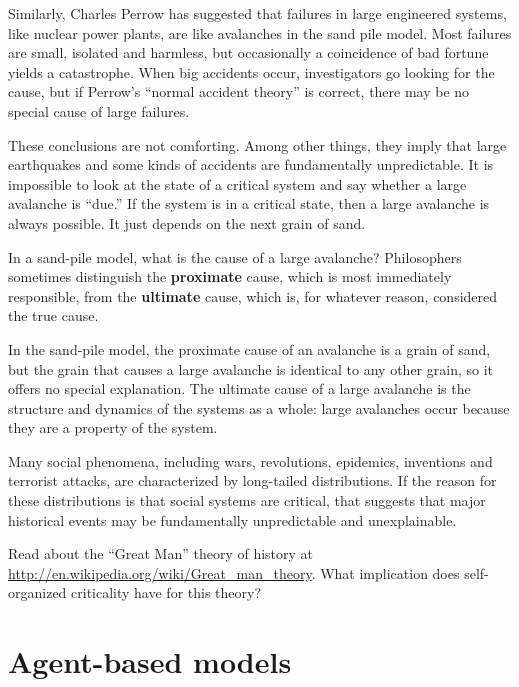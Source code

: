 \documentclass[10pt]{book}
\begin{document}
Similarly, Charles Perrow has suggested that failures in large
engineered systems, like nuclear power plants, are like avalanches
in the sand pile model.  Most failures are small, isolated and
harmless, but occasionally a coincidence of bad fortune yields a
catastrophe.  When big accidents occur, investigators go looking for
the cause, but if Perrow's ``normal accident theory'' is correct,
there may be no special cause of large failures.

These conclusions are not comforting.  Among other things, they
imply that large earthquakes and some kinds of accidents are
fundamentally unpredictable.  It is impossible to look at the
state of a critical system and say whether a large avalanche
is ``due.''  If the system is in a critical state, then a large
avalanche is always possible.  It just depends on the
next grain of sand.

In a sand-pile model, what is the cause of a large avalanche?
Philosophers sometimes distinguish the {\bf proximate} cause, which is
most immediately responsible, from the {\bf ultimate} cause, which is,
for whatever reason, considered the true cause.

In the sand-pile model, the proximate cause of an avalanche is
a grain of sand, but the grain that causes a large avalanche
is identical to any other grain, so it offers no special explanation.
The ultimate cause of a large avalanche is the structure and
dynamics of the systems as a whole: large avalanches occur because
they are a property of the system.

Many social phenomena, including wars, revolutions, epidemics,
inventions and terrorist attacks, are characterized by long-tailed
distributions.  If the reason for these distributions is that
social systems are critical, that suggests that major historical
events may be fundamentally unpredictable and unexplainable.

\begin{exercise}

Read about the ``Great Man'' theory of history at
\url{http://en.wikipedia.org/wiki/Great_man_theory}.  What implication
does self-organized criticality have for this theory?

\end{exercise}


\chapter{Agent-based models}
\label{agent-based}
\end{document}

